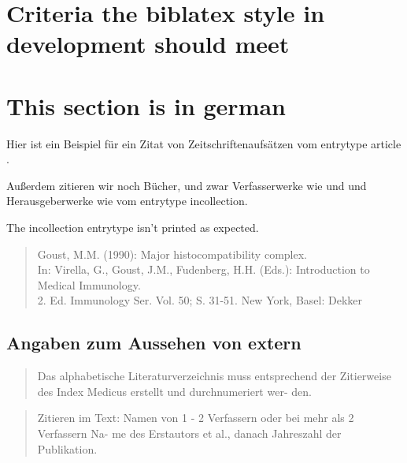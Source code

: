 \documentclass{article}
\begin{document}
\section{Criteria the biblatex style in development should meet}

\section{This section is in german}

Hier ist ein Beispiel für ein Zitat von Zeitschriftenaufsätzen vom entrytype article \parencite{martin1991}.

Außerdem zitieren wir noch Bücher, und zwar Verfasserwerke wie \cite{spiro1977} und \cite{burck1988}
und Herausgeberwerke wie \cite{goust1990} vom entrytype incollection.

The incollection entrytype isn't printed as expected.

\begin{quote}
Goust, M.M. (1990): Major histocompatibility complex.\\
In: Virella, G., Goust, J.M., Fudenberg, H.H. (Eds.): Introduction to Medical Immunology.\\
2. Ed. Immunology Ser. Vol. 50; S. 31-51. New York, Basel: Dekker
\end{quote}


\subsection{Angaben zum Aussehen von extern}

\begin{quote}
Das alphabetische Literaturverzeichnis muss entsprechend der
Zitierweise des Index Medicus erstellt und durchnumeriert wer-
den.
\end{quote}

\begin{quote}
Zitieren im Text: Namen von 1 - 2 Verfassern oder bei mehr als 2 Verfassern Na-
me des Erstautors et al., danach Jahreszahl der Publikation.
\end{quote}
\end{document}
